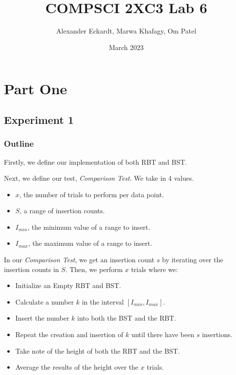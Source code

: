 \documentclass{article}
\title{COMPSCI 2XC3 Lab 6}
\author{Alexander Eckardt, Marwa Khafagy, Om Patel}
\date{March 2023}
\begin{document}
\maketitle
\newpage

\tableofcontents
\newpage

\tableoffigures
\newpage



\section{Part One}

\subsection{Experiment 1}
\subsubsection{Outline}

Firstly, we define our implementation of both RBT and BST.

Next, we define our test, \textit{Comparison Test}. We take in 4 values.
\begin{itemize}
    \item $x$, the number of trials to perform per data point.
    \item $S$, a range of insertion counts.
    \item $I_{min}$, the minimum value of a range to insert.
    \item $I_{max}$, the maximum value of a range to insert.
\end{itemize}

In our \textit{Comparison Test}, we get an insertion count $s$ by iterating over the insertion counts in $S$.
Then, we perform $x$ trials where we:

\begin{itemize}
    \item Initialize an Empty RBT and BST.
    \item Calculate a number $k$ in the interval $[I_{min}, I_{max}]$.
    \item Insert the number $k$ into both the BST and the RBT.
    \item Repeat the creation and insertion of $k$ until there have been $s$ insertions.
    \item Take note of the height of both the RBT and the BST.
    \item Average the results of the height over the $x$ trials.
\end{itemize}
\end{document}
